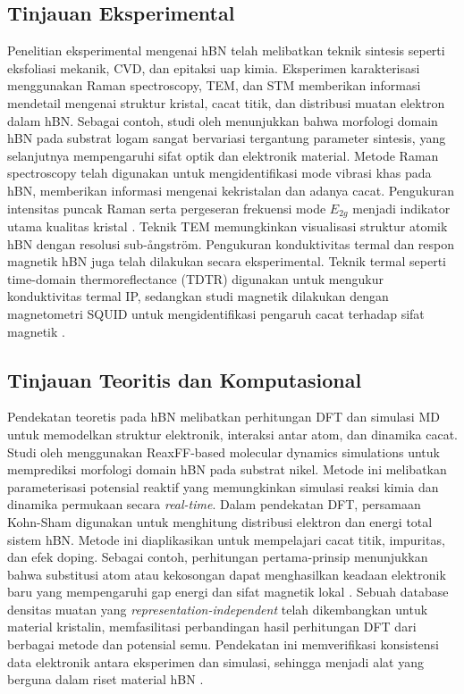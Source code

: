 \subsection{Tinjauan Eksperimental}
Penelitian eksperimental mengenai hBN telah melibatkan teknik sintesis seperti eksfoliasi mekanik, CVD, dan epitaksi uap kimia.
Eksperimen karakterisasi menggunakan Raman spectroscopy, TEM, dan STM memberikan informasi mendetail mengenai struktur kristal, cacat titik, dan distribusi muatan elektron dalam hBN.
Sebagai contoh, studi oleh \citep{Bhimanapati2016} menunjukkan bahwa morfologi domain hBN pada substrat logam sangat bervariasi tergantung parameter sintesis, yang selanjutnya mempengaruhi sifat optik dan elektronik material.
Metode Raman spectroscopy telah digunakan untuk mengidentifikasi mode vibrasi khas pada hBN, memberikan informasi mengenai kekristalan dan adanya cacat.
Pengukuran intensitas puncak Raman serta pergeseran frekuensi mode \(E_{2g}\) menjadi indikator utama kualitas kristal \citep{Wang2017}.
Teknik TEM memungkinkan visualisasi struktur atomik hBN dengan resolusi sub-ångström.
Pengukuran konduktivitas termal dan respon magnetik hBN juga telah dilakukan secara eksperimental.
Teknik termal seperti time-domain thermoreflectance (TDTR) digunakan untuk mengukur konduktivitas termal IP, sedangkan studi magnetik dilakukan dengan magnetometri SQUID untuk mengidentifikasi pengaruh cacat terhadap sifat magnetik \citep{Zhang2020}.

\subsection{Tinjauan Teoritis dan Komputasional}
Pendekatan teoretis pada hBN melibatkan perhitungan DFT dan simulasi MD untuk memodelkan struktur elektronik, interaksi antar atom, dan dinamika cacat.
Studi oleh \citep{Lele2022} menggunakan ReaxFF-based molecular dynamics simulations untuk memprediksi morfologi domain hBN pada substrat nikel.
Metode ini melibatkan parameterisasi potensial reaktif yang memungkinkan simulasi reaksi kimia dan dinamika permukaan secara \emph{real-time}.
Dalam pendekatan DFT, persamaan Kohn-Sham digunakan untuk menghitung distribusi elektron dan energi total sistem hBN.
Metode ini diaplikasikan untuk mempelajari cacat titik, impuritas, dan efek doping.
Sebagai contoh, perhitungan pertama-prinsip menunjukkan bahwa substitusi atom atau kekosongan dapat menghasilkan keadaan elektronik baru yang mempengaruhi gap energi dan sifat magnetik lokal \citep{Zhang2020}.
Sebuah database densitas muatan yang \emph{representation-independent} telah dikembangkan untuk material kristalin, memfasilitasi perbandingan hasil perhitungan DFT dari berbagai metode dan potensial semu.
Pendekatan ini memverifikasi konsistensi data elektronik antara eksperimen dan simulasi, sehingga menjadi alat yang berguna dalam riset material hBN \citep{Shen2022}.

